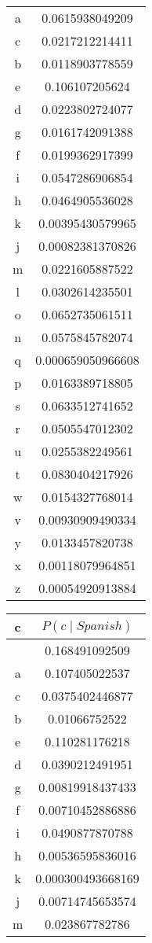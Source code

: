 \documentclass{article}
\begin{document}
\begin{center}
\begin{tabular}{c|c}
a & 0.0615938049209 \\
c & 0.0217212214411 \\
b & 0.0118903778559 \\
e & 0.106107205624 \\
d & 0.0223802724077 \\
g & 0.0161742091388 \\
f & 0.0199362917399 \\
i & 0.0547286906854 \\
h & 0.0464905536028 \\
k & 0.00395430579965 \\
j & 0.00082381370826 \\
m & 0.0221605887522 \\
l & 0.0302614235501 \\
o & 0.0652735061511 \\
n & 0.0575845782074 \\
q & 0.000659050966608 \\
p & 0.0163389718805 \\
s & 0.0633512741652 \\
r & 0.0505547012302 \\
u & 0.0255382249561 \\
t & 0.0830404217926 \\
w & 0.0154327768014 \\
v & 0.00930909490334 \\
y & 0.0133457820738 \\
x & 0.00118079964851 \\
z & 0.00054920913884 \\
\end{tabular}
\begin{tabular}{c|c}
c & $P(c \mid Spanish)$ \\ \hline  & 0.168491092509 \\
a & 0.107405022537 \\
c & 0.0375402446877 \\
b & 0.01066752522 \\
e & 0.110281176218 \\
d & 0.0390212491951 \\
g & 0.00819918437433 \\
f & 0.00710452886886 \\
i & 0.0490877870788 \\
h & 0.00536595836016 \\
k & 0.000300493668169 \\
j & 0.00714745653574 \\
m & 0.023867782786 \\

\end{tabular}
\end{center}
\end{document}
